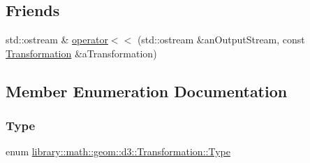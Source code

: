 \subsection*{Friends}
\begin{DoxyCompactItemize}
\item 
std\+::ostream \& \hyperlink{classlibrary_1_1math_1_1geom_1_1d3_1_1_transformation_afb2829e106dc4aeab1c706d1eaa357e8}{operator$<$$<$} (std\+::ostream \&an\+Output\+Stream, const \hyperlink{classlibrary_1_1math_1_1geom_1_1d3_1_1_transformation}{Transformation} \&a\+Transformation)
\end{DoxyCompactItemize}


\subsection{Member Enumeration Documentation}
\mbox{\label{classlibrary_1_1math_1_1geom_1_1d3_1_1_transformation_a25f1dc99d391174bf82a7132d08b2fc1}} 
\subsubsection{\texorpdfstring{Type}{Type}}
{\footnotesize\ttfamily enum \hyperlink{classlibrary_1_1math_1_1geom_1_1d3_1_1_transformation_a25f1dc99d391174bf82a7132d08b2fc1}{library\+::math\+::geom\+::d3\+::\+Transformation\+::\+Type}\hspace{0.3cm}{\ttfamily [strong]}}

